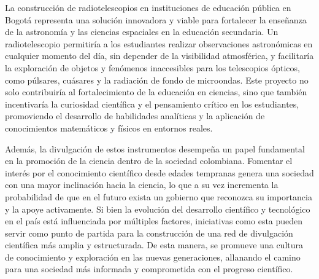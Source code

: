 La construcción de radiotelescopios en instituciones de educación pública en
Bogotá representa una solución innovadora y viable para fortalecer la enseñanza
de la astronomía y las ciencias espaciales en la educación secundaria. Un
radiotelescopio permitiría a los estudiantes realizar observaciones astronómicas
en cualquier momento del día, sin depender de la visibilidad atmosférica,
y facilitaría la exploración de objetos y fenómenos inaccesibles para los
telescopios ópticos, como púlsares, cuásares y la radiación de fondo de
microondas. Este proyecto no solo contribuiría al fortalecimiento de la
educación en ciencias, sino que también incentivaría la curiosidad científica
y el pensamiento crítico en los estudiantes, promoviendo el desarrollo de
habilidades analíticas y la aplicación de conocimientos matemáticos y físicos en
entornos reales.

Además, la divulgación de estos instrumentos desempeña un papel fundamental en
la promoción de la ciencia dentro de la sociedad colombiana. Fomentar el interés
por el conocimiento científico desde edades tempranas genera una sociedad con
una mayor inclinación hacia la ciencia, lo que a su vez incrementa la
probabilidad de que en el futuro exista un gobierno que reconozca su importancia
y la apoye activamente. Si bien la evolución del desarrollo científico
y tecnológico en el país está influenciada por múltiples factores, iniciativas
como esta pueden servir como punto de partida para la construcción de una red de
divulgación científica más amplia y estructurada. De esta manera, se promueve
una cultura de conocimiento y exploración en las nuevas generaciones, allanando
el camino para una sociedad más informada y comprometida con el progreso
científico.
